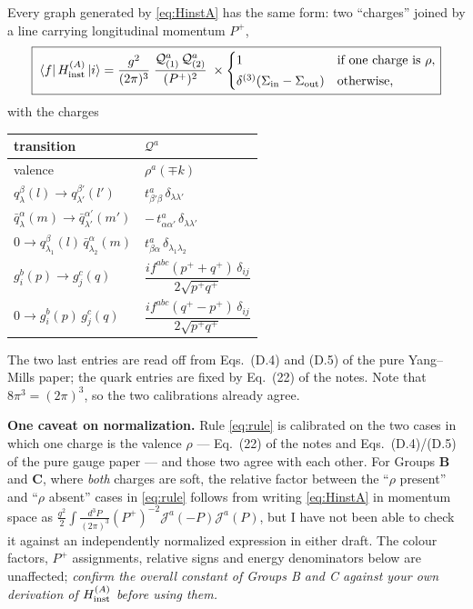 \documentclass[11pt]{article}
\newcommand{\dthree}{\delta^{(3)}}
\newcommand{\ket}[1]{\left|#1\right\rangle}
\newcommand{\bra}[1]{\left\langle#1\right|}
\newcommand{\Jc}{\mathcal{J}}
\begin{document}
Every graph generated by \eqref{eq:HinstA} has the same form: two ``charges'' joined by a line
carrying longitudinal momentum $P^{+}$,
\begin{equation}
\boxed{\;
\bra{f}H^{(A)}_{\rm inst}\ket{i}=\frac{g^{2}}{(2\pi)^{3}}\;
\frac{\mathcal{Q}^{a}_{(1)}\,\mathcal{Q}^{a}_{(2)}}{(P^{+})^{2}}\;\times
\begin{cases}
1 & \text{if one charge is }\rho,\\[2pt]
\dthree(\Sigma_{\rm in}-\Sigma_{\rm out}) & \text{otherwise,}
\end{cases}}
\label{eq:rule}
\end{equation}
with the charges
\begin{center}
\renewcommand{\arraystretch}{1.5}
\begin{tabular}{ll}
\hline
transition & $\mathcal{Q}^{a}$\\
\hline
valence & $\rho^{a}(\mp k)$\\
$q^{\beta}_{\lambda}(l)\to q^{\beta'}_{\lambda'}(l')$ &
$t^{a}_{\beta'\beta}\,\delta_{\lambda\lambda'}$\\
$\bar q^{\alpha}_{\lambda}(m)\to\bar q^{\alpha'}_{\lambda'}(m')$ &
$-\,t^{a}_{\alpha\alpha'}\,\delta_{\lambda\lambda'}$\\
$0\to q^{\beta}_{\lambda_{1}}(l)\,\bar q^{\alpha}_{\lambda_{2}}(m)$ &
$t^{a}_{\beta\alpha}\,\delta_{\lambda_{1}\lambda_{2}}$\\
$g^{b}_{i}(p)\to g^{c}_{j}(q)$ &
$\dfrac{i f^{abc}(p^{+}+q^{+})\,\delta_{ij}}{2\sqrt{p^{+}q^{+}}}$\\
$0\to g^{b}_{i}(p)\,g^{c}_{j}(q)$ &
$\dfrac{i f^{abc}(q^{+}-p^{+})\,\delta_{ij}}{2\sqrt{p^{+}q^{+}}}$\\
\hline
\end{tabular}
\end{center}
The two last entries are read off from Eqs.~(D.4) and (D.5) of the pure Yang--Mills paper; the
quark entries are fixed by Eq.~(22) of the notes. Note that $8\pi^{3}=(2\pi)^{3}$, so the two
calibrations already agree.

\begin{warn}
\textbf{One caveat on normalization.} Rule \eqref{eq:rule} is calibrated on the two cases in which
one charge is the valence $\rho$ --- Eq.~(22) of the notes and Eqs.~(D.4)/(D.5) of the pure gauge
paper --- and those two agree with each other. For Groups \textbf{B} and \textbf{C}, where
\emph{both} charges are soft, the relative factor between the ``$\rho$ present'' and ``$\rho$
absent'' cases in \eqref{eq:rule} follows from writing \eqref{eq:HinstA} in momentum space as
$\tfrac{g^{2}}{2}\!\int\!\tfrac{d^{3}P}{(2\pi)^{3}}(P^{+})^{-2}\Jc^{a}(-P)\Jc^{a}(P)$, but I have
not been able to check it against an independently normalized expression in either draft. The
colour factors, $P^{+}$ assignments, relative signs and energy denominators below are
unaffected; \emph{confirm the overall constant of Groups B and C against your own derivation of
$H^{(A)}_{\rm inst}$ before using them.}
\end{warn}
\end{document}
